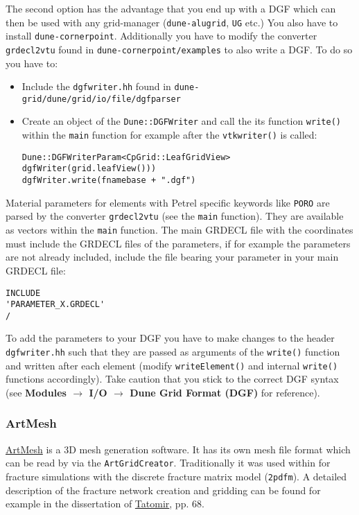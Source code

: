 The second option has the advantage that you end up with a DGF which can then be used with any grid-manager (\texttt{dune-alugrid}, \texttt{UG} etc.) You also have to install \texttt{dune-cornerpoint}. Additionally you have to modify the converter \texttt{grdecl2vtu} found in \texttt{dune-cornerpoint/examples} to also write a DGF. To do so you have to:
\begin{itemize}
 \item Include the \texttt{dgfwriter.hh} found in \texttt{dune-grid/dune/grid/io/file/dgfparser}
 \item Create an object of the \texttt{Dune::DGFWriter} and call the its function \texttt{write()} within the \texttt{main} function for example after the \texttt{vtkwriter()} is called:
\begin{lstlisting}[style=DumuxCode]
Dune::DGFWriterParam<CpGrid::LeafGridView> dgfWriter(grid.leafView()))
dgfWriter.write(fnamebase + ".dgf")
\end{lstlisting}
\end{itemize}
Material parameters for elements with Petrel specific keywords like \texttt{PORO} are parsed by the converter \texttt{grdecl2vtu} (see the \texttt{main} function). They are available as vectors within the \texttt{main} function. The main GRDECL file with the coordinates must include the GRDECL files of the parameters, if for example the parameters are not already included, include the file bearing your parameter in your main GRDECL file:
\begin{lstlisting}
INCLUDE
'PARAMETER_X.GRDECL'
/
\end{lstlisting}
To add the parameters to your DGF you have to make changes to the header \texttt{dgfwriter.hh} such that they are passed as arguments of the \texttt{write()} function and written after each element (modify \texttt{writeElement()} and internal \texttt{write()} functions accordingly). Take caution that you stick to the correct DGF syntax (see \textbf{Modules $\rightarrow$ I/O $\rightarrow$ Dune Grid Format (DGF)} for reference).

\subsubsection{ArtMesh}
\href{http://www.topologica.org/toplog/wp/}{ArtMesh} is a 3D mesh generation software. It has its own mesh file format
which can be read by \Dumux via the \texttt{ArtGridCreator}. Traditionally it was used within \Dumux for fracture simulations with
the discrete fracture matrix model (\texttt{2pdfm}). A detailed description of the fracture network creation and gridding
can be found for example in the dissertation of \href{http://elib.uni
-stuttgart.de/opus/frontdoor.php?source_opus=8047&la=de}{Tatomir}, pp. 68.

